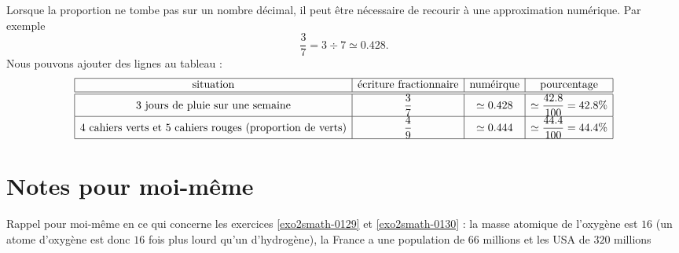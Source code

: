 Lorsque la proportion ne tombe pas sur un nombre décimal, il peut être nécessaire de recourir à une approximation numérique. Par exemple 
\begin{equation}
    \frac{ 3 }{ 7 }=3\div 7\simeq 0.428.
\end{equation}
Nous pouvons ajouter des lignes au tableau :
\begin{equation*}
    \begin{array}[]{|c|c|c|c|}
        \hline
        \text{situation}&\text{écriture fractionnaire}&\text{numéirque}&\text{pourcentage}\\
        \hline\hline
        \text{\( 3\) jours de pluie sur une semaine}&\dfrac{ 3 }{ 7 }&  \simeq 0.428 &\simeq \dfrac{ 42.8 }{ 100 }=42.8\%\\
        \hline
        \text{\( 4\) cahiers verts et \( 5\) cahiers rouges (proportion de verts)}&\dfrac{ 4 }{ 9 }&  \simeq 0.444 &\simeq \dfrac{ 44.4 }{ 100 }=44.4\%\\
        \hline
    \end{array}
\end{equation*}




\section{Notes pour moi-même}

Rappel pour moi-même en ce qui concerne les exercices \ref{exo2smath-0129} et \ref{exo2smath-0130} : la masse atomique de l'oxygène est \( 16\) (un atome d'oxygène est donc \( 16\) fois plus lourd qu'un d'hydrogène), la France a une population de \( 66\) millions et les USA de \( 320\) millions

